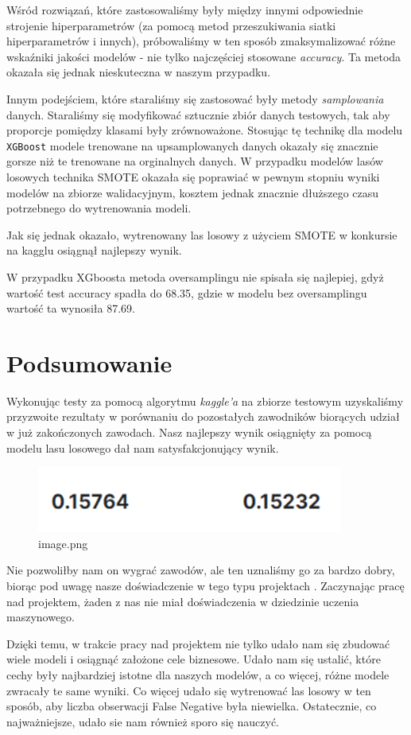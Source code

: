 \documentclass[11pt]{article}
\begin{document}
Wśród rozwiązań, które zastosowaliśmy były między innymi odpowiednie
strojenie hiperparametrów (za pomocą metod przeszukiwania siatki
hiperparametrów i innych), próbowaliśmy w ten sposób zmaksymalizować
różne wskaźniki jakości modelów - nie tylko najczęściej stosowane
\emph{accuracy}. Ta metoda okazała się jednak nieskuteczna w naszym
przypadku.

Innym podejściem, które staraliśmy się zastosować były metody
\emph{samplowania} danych. Staraliśmy się modyfikować sztucznie zbiór
danych testowych, tak aby proporcje pomiędzy klasami były zrównoważone.
Stosując tę technikę dla modelu \texttt{XGBoost} modele trenowane na
upsamplowanych danych okazały się znacznie gorsze niż te trenowane na
orginalnych danych. W przypadku modelów lasów losowych technika SMOTE
okazała się poprawiać w pewnym stopniu wyniki modelów na zbiorze
walidacyjnym, kosztem jednak znacznie dłuższego czasu potrzebnego do
wytrenowania modeli.

Jak się jednak okazało, wytrenowany las losowy z użyciem SMOTE w
konkursie na kagglu osiągnął najlepszy wynik.

W przypadku XGboosta metoda oversamplingu nie spisała się najlepiej,
gdyż wartość test accuracy spadła do 68.35, gdzie w modelu bez
oversamplingu wartość ta wynosiła 87.69.

    \hypertarget{podsumowanie}{%
\section{Podsumowanie}\label{podsumowanie}}

Wykonując testy za pomocą algorytmu \emph{kaggle'a} na zbiorze testowym
uzyskaliśmy przyzwoite rezultaty w porównaniu do pozostałych zawodników
biorących udział w już zakończonych zawodach. Nasz najlepszy wynik
osiągnięty za pomocą modelu lasu losowego dał nam satysfakcjonujący
wynik.

\begin{figure}
\centering
\includegraphics{raport_files/image.png}
\caption{image.png}
\end{figure}

Nie pozwoliłby nam on wygrać zawodów, ale ten uznaliśmy go za bardzo
dobry, biorąc pod uwagę nasze doświadczenie w tego typu projektach .
Zaczynając pracę nad projektem, żaden z nas nie miał doświadczenia w
dziedzinie uczenia maszynowego.

Dzięki temu, w trakcie pracy nad projektem nie tylko udało nam się
zbudować wiele modeli i osiągnąć założone cele biznesowe. Udało nam się
ustalić, które cechy były najbardziej istotne dla naszych modelów, a co
więcej, różne modele zwracały te same wyniki. Co więcej udało się
wytrenować las losowy w ten sposób, aby liczba obserwacji False Negative
była niewielka. Ostatecznie, co najważniejsze, udało sie nam również
sporo się nauczyć.


    
    
    
\end{document}
